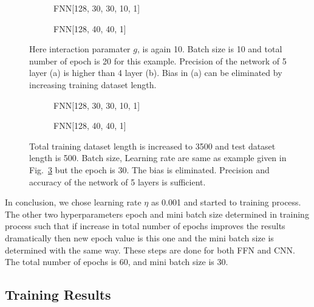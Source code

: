 \documentclass[a4paper,times,12pt]{article}
\begin{document}
\begin{figure}[H]
    \centering
    \begin{subfigure}[t]{0.45\textwidth}
           \centering
            
            \caption{FNN[128, 30, 30, 10, 1]}
            \label{fig:a}
    \end{subfigure}\hfill
    \begin{subfigure}[t]{0.45\textwidth}
            \centering
             
            \caption{FNN[128, 40, 40, 1]}
            \label{fig:b}
    \end{subfigure}
    \caption{Here interaction paramater $g$, is again 10. Batch size is 10 and total number of epoch is 20 for this example. Precision of the network of 5 layer (a) is higher than 4 layer (b). Bias in (a) can be eliminated by increasing training dataset length.}
\label{fig:network_layer_increment}
\end{figure}

\begin{figure}[H]
    \centering
    \begin{subfigure}[t]{0.45\textwidth}
		\centering
        
        \caption{FNN[128, 30, 30, 10, 1]}
		\label{fig:a}
    \end{subfigure}\hfill
    \begin{subfigure}[t]{0.45\textwidth}
        \centering
        
        \caption{FNN[128, 40, 40, 1]}
		\label{fig:b}
    \end{subfigure}
    \caption{Total training dataset length is increased to 3500 and test dataset length is 500. Batch size, Learning rate are same as example given in Fig.~\ref{fig:network_layer_increment} but the epoch is 30. The bias is eliminated. Precision and accuracy of the network of 5 layers is sufficient.}
\end{figure}

In conclusion, we chose learning rate $\eta$ as 0.001 and started to training process. The other two hyperparameters epoch and mini batch size determined in training process such that if increase in total number of epochs improves the results dramatically then new epoch value is this one and the mini batch size is determined with the same way. These steps are done for both FFN and CNN. The total number of epochs is 60, and mini batch size is 30. 


\subsection{Training Results}
\end{document}
